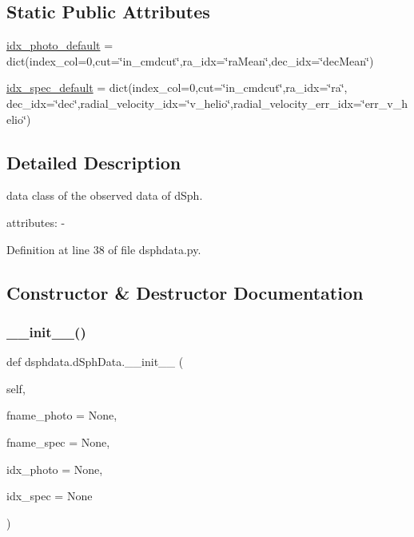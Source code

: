 \subsection*{Static Public Attributes}
\begin{DoxyCompactItemize}
\item 
\hyperlink{classdsphdata_1_1dSphData_a1ebfbfbd27ed84f68b401606530c35ef}{idx\+\_\+photo\+\_\+default} = dict(index\+\_\+col=0,cut=\char`\"{}in\+\_\+cmdcut\char`\"{},ra\+\_\+idx=\char`\"{}ra\+Mean\char`\"{},dec\+\_\+idx=\char`\"{}dec\+Mean\char`\"{})
\item 
\hyperlink{classdsphdata_1_1dSphData_aaebb5308a014e2064f325f1897ae366a}{idx\+\_\+spec\+\_\+default} = dict(index\+\_\+col=0,cut=\char`\"{}in\+\_\+cmdcut\char`\"{},ra\+\_\+idx=\char`\"{}ra\char`\"{}, dec\+\_\+idx=\char`\"{}dec\char`\"{},radial\+\_\+velocity\+\_\+idx=\char`\"{}v\+\_\+helio\char`\"{},radial\+\_\+velocity\+\_\+err\+\_\+idx=\char`\"{}err\+\_\+v\+\_\+helio\char`\"{})
\end{DoxyCompactItemize}


\subsection{Detailed Description}
\begin{DoxyVerb}data class of the observed data of dSph.

attributes:
    - \end{DoxyVerb}
 

Definition at line 38 of file dsphdata.\+py.



\subsection{Constructor \& Destructor Documentation}
\mbox{\label{classdsphdata_1_1dSphData_afcd54ca5255be74de80578f5962daba8}} 
\subsubsection{\texorpdfstring{\+\_\+\+\_\+init\+\_\+\+\_\+()}{\_\_init\_\_()}}
{\footnotesize\ttfamily def dsphdata.\+d\+Sph\+Data.\+\_\+\+\_\+init\+\_\+\+\_\+ (\begin{DoxyParamCaption}\item[{}]{self,  }\item[{}]{fname\+\_\+photo = {\ttfamily None},  }\item[{}]{fname\+\_\+spec = {\ttfamily None},  }\item[{}]{idx\+\_\+photo = {\ttfamily None},  }\item[{}]{idx\+\_\+spec = {\ttfamily None} }\end{DoxyParamCaption})}

